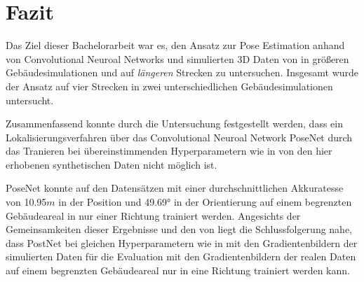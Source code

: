 
\section{Fazit}
\label{sec:kapitel_6}
Das Ziel dieser Bachelorarbeit war es, den Ansatz zur Pose Estimation anhand von Convolutional Neuroal Networks und simulierten 3D Daten von \citet{acharyaBIMPoseNetIndoorCamera2019} in größeren Gebäudesimulationen und auf \textit{längeren} Strecken zu untersuchen.
Insgesamt wurde der Ansatz auf vier Strecken in zwei unterschiedlichen Gebäudesimulationen untersucht. 

Zusammenfassend konnte durch die Untersuchung festgestellt werden, dass ein Lokalisierungsverfahren über das Convolutional Neuroal Network PoseNet durch das Tranieren bei übereinstimmenden Hyperparametern wie in \cite{acharyaBIMPoseNetIndoorCamera2019} von den hier erhobenen synthetischen Daten nicht möglich ist. 

PoseNet konnte auf den Datensätzen mit einer durchschnittlichen Akkuratesse von 10.95$m$ in der Position und 49.69° in der Orientierung auf einem begrenzten Gebäudeareal in nur einer Richtung trainiert werden. Angesichts der Gemeinsamkeiten dieser Ergebnisse und den von \citet{acharyaBIMPoseNetIndoorCamera2019} liegt die Schlussfolgerung nahe, dass PostNet bei gleichen Hyperparametern wie in \cite{acharyaBIMPoseNetIndoorCamera2019} mit den Gradientenbildern der simulierten Daten für die Evaluation mit den Gradientenbildern der realen Daten auf einem begrenzten Gebäudeareal nur in eine Richtung trainiert werden kann.